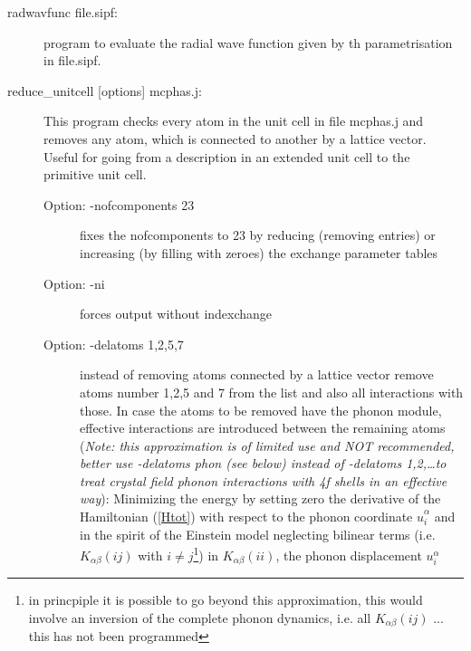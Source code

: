 \begin{description}
\item[\prg radwavfunc\label{radwavfunc} file.sipf:] program to evaluate the radial wave function
given by th parametrisation in file.sipf.
\item[\prg reduce\_unitcell {[options]} mcphas.j:] 
                This program checks every atom in the unit cell in file mcphas.j and removes
                any atom, which is connected to another by a lattice vector. Useful for
                going from a description in an extended unit cell to the primitive unit cell.
\begin{description}
\item[Option: -nofcomponents 23] fixes the nofcomponents to 23 by 
                         reducing (removing entries) or increasing (by filling with zeroes) 
                         the exchange parameter tables
\item[Option:  -ni ] forces output without indexchange  
\item[Option: -delatoms 1,2,5,7 ]  instead of removing atoms connected by a lattice vector 
 			remove atoms number 1,2,5 and 7 from the list and also all interactions with those.
                        In case the atoms to be removed have the phonon module, 
                         effective interactions are introduced between the remaining atoms
                        ({\em Note: this  approximation is of limited use and NOT recommended, better 
                       use -delatoms phon (see below) instead of -delatoms 1,2,\dots to treat
                        crystal field phonon interactions with 4f shells  in an effective way}):
                     {\tiny   
                        Minimizing the energy by setting zero the derivative of the Hamiltonian (\ref{Htot}) with respect to the phonon coordinate
                        $\hat u_i^{\alpha}$ and in the spirit of the Einstein model neglecting bilinear terms 
                        (i.e. $K_{\alpha\beta}(ij)$ with $i \neq j$\footnote{in princpiple it is possible
                        to go beyond this approximation, this would involve an inversion of the complete phonon
                        dynamics, i.e. all  $K_{\alpha\beta}(ij)$ ... this has not been programmed}) in $K_{\alpha\beta}(ii)$,  the phonon displacement $u_i^{\alpha}$
}
\end{description}
\end{description}

